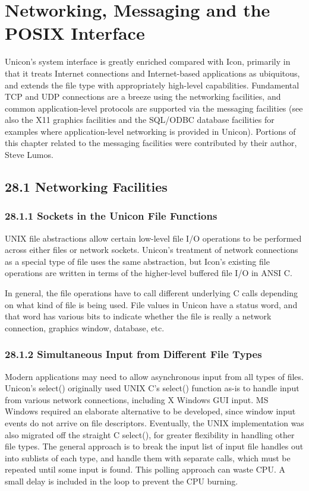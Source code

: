 \chapter{Networking, Messaging and the POSIX Interface}

Unicon's system interface is greatly enriched compared with Icon,
primarily in that it treats Internet connections and Internet-based
applications as ubiquitous, and extends the file type with
appropriately high-level capabilities.  Fundamental TCP and UDP
connections are a breeze using the networking facilities, and common
application-level protocols are supported via the messaging facilities
(see also the X11 graphics facilities and the SQL/ODBC database
facilities for examples where application-level networking is provided
in Unicon). Portions of this chapter related to the messaging
facilities were contributed by their author, Steve Lumos.

\section[28.1 Networking Facilities]{28.1 Networking Facilities}

\subsection[28.1.1 Sockets in the Unicon File Functions]{28.1.1 Sockets in the Unicon File Functions}

UNIX file abstractions allow certain low-level file I/O
operations to be performed across either files or network sockets.
Unicon's treatment of network connections as a special type of file
uses the same abstraction, but Icon's existing file operations are
written in terms of the higher-level buffered file I/O in ANSI C.

In general, the file operations have to call different underlying C calls 
depending on what kind of file is being used.  File values in Unicon
have a status word, and that word has various bits to indicate whether
the file is really a network connection, graphics window, database, etc.

\subsection[28.1.2 Simultaneous Input from Different File Types]{28.1.2 Simultaneous Input from Different File Types}

Modern applications may need to allow asynchronous input from all
types of files. Unicon's select() originally used UNIX C's select()
function as-is to handle input from various network connections,
including X Windows GUI input.  MS Windows required an elaborate
alternative to be developed, since window input events do not
arrive on file descriptors.  Eventually, the UNIX implementation
was also migrated off the straight C select(), for greater flexibility
in handling other file types.  The general approach is to break the
input list of input file handles out into sublists of each type, and
handle them with separate calls, which must be repeated until some
input is found.  This polling approach can waste CPU. A small delay
is included in the loop to prevent the CPU burning.


